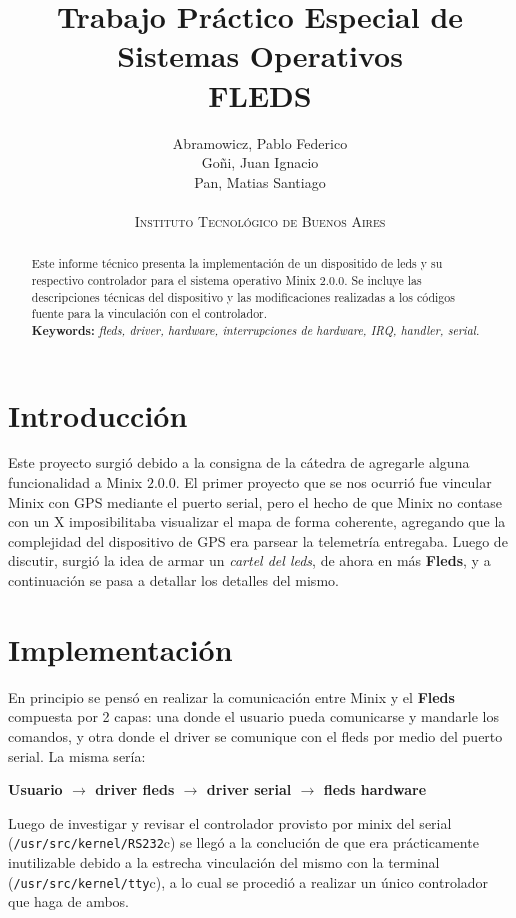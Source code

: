 \documentclass[a4paper,11pt,epsf]{article}
\title{
{\large \bfseries Trabajo Pr\'actico Especial de Sistemas Operativos}
\\
\vspace{24pt}
\textbf{FLEDS}
}
\author{Abramowicz, Pablo Federico \\ 
Go\~ni, Juan Ignacio \\ 
Pan, Matias Santiago\\
$\phantom{1}$ \\ 
\textsc{Instituto Tecnol\'ogico de Buenos Aires} }
\date{}
\begin{document}
\maketitle

\newpage

\tableofcontents

\newpage

\begin{abstract}
Este informe t\'ecnico presenta la implementaci\'on de un dispositido de leds y su respectivo controlador para el sistema operativo Minix $2.0.0$. Se incluye las descripciones t\'ecnicas del dispositivo y las modificaciones realizadas a los c\'odigos fuente para la vinculaci\'on con el controlador.\\ 
\textbf{Keywords:} \textit{fleds, driver, hardware, interrupciones de hardware, IRQ, handler, serial.} 
\end{abstract}

\section{Introducci\'on}

Este proyecto surgi\'o debido a la consigna de la c\'atedra de agregarle alguna funcionalidad a Minix $2.0.0$. El primer proyecto que se nos ocurri\'o fue vincular Minix con GPS mediante el puerto serial, pero el hecho de que Minix no contase con un X imposibilitaba visualizar el mapa de forma coherente, agregando que la complejidad del dispositivo de GPS era parsear la telemetr\'ia entregaba. Luego de discutir, surgi\'o la idea de armar un \emph{cartel del leds}, de ahora en m\'as \textbf{Fleds}, y a continuaci\'on se pasa a detallar los detalles del mismo.

\section{Implementaci\'on}
En principio se pens\'o en realizar la comunicaci\'on entre Minix y el \textbf{Fleds} compuesta por 2 capas: una donde el usuario pueda comunicarse y mandarle los comandos, y otra donde el driver se comunique con el fleds por medio del puerto serial. La misma ser\'ia:

\textbf{Usuario $\rightarrow$ driver fleds $\rightarrow$ driver serial $\rightarrow$ fleds hardware}

Luego de investigar y revisar el controlador provisto por minix del serial (\verb./usr/src/kernel/RS232.c) se lleg\'o a la concluci\'on de que era pr\'acticamente inutilizable debido a la estrecha vinculaci\'on del mismo con la terminal (\verb./usr/src/kernel/tty.c), a lo cual se procedi\'o a realizar un \'unico controlador que haga de ambos.
\end{document}
